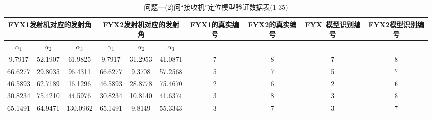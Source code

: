\documentclass[withoutpreface,bwprint]{cumcmthesis}
\begin{document}
\begin{appendices}
		
		\begin{table}[htbp!]
			\footnotesize
			\caption{问题一(2)问“接收机”定位模型验证数据表(1-35)}
			\centering
			\tabcolsep=0.1cm
			\begin{tabular}{@{}cccccccccc@{}}
				\toprule
				\multicolumn{3}{c}{\textbf{FYX1发射机对应的发射角}}                                                           & \multicolumn{3}{c}{\textbf{FYX2发射机对应的发射角}}                                                           & \textbf{FYX1的真实编号} & \textbf{FYX2的真实编号} & \textbf{FYX1模型识别编号} & \textbf{FYX2模型识别编号} \\ \midrule
				\multicolumn{1}{c|}{\textbf{$\alpha_{1}$}} & \multicolumn{1}{c|}{\textbf{$\alpha_{2}$}} & \multicolumn{1}{c|}{\textbf{$\alpha_{3}$}} & \multicolumn{1}{c|}{\textbf{$\alpha_{1}$}} & \multicolumn{1}{c|}{\textbf{$\alpha_{2}$}} & \multicolumn{1}{c|}{\textbf{$\alpha_{3}$}} & \multicolumn{4}{c}{\textbf{}}  
				\\ \midrule
				9.7917                           & 52.1907                          & 61.9825                          & 9.7917                           & 31.2953                          & 41.0871                          & 7                    & 8                    & 7                      & 8                      \\
				66.6277                          & 29.8035                          & 96.4311                          & 66.6277                          & 9.3708                           & 57.2568                          & 5                    & 7                    & 5                      & 7                      \\
				46.5893                          & 62.7189                          & 16.1296                          & 46.5893                          & 28.8778                          & 75.4670                          & 2                    & 6                    & 2                      & 6                      \\
				30.8234                          & 75.4210                          & 44.5976                          & 30.8234                          & 10.8140                          & 41.6374                          & 3                    & 8                    & 3                      & 8                      \\
				65.1491                          & 64.9471                          & 130.0962                         & 65.1491                          & 9.8149                           & 55.3343                          & 3                    & 7                    & 3                      & 7                      \\

\end{tabular}
\end{table}
\end{appendices}
\end{document}
